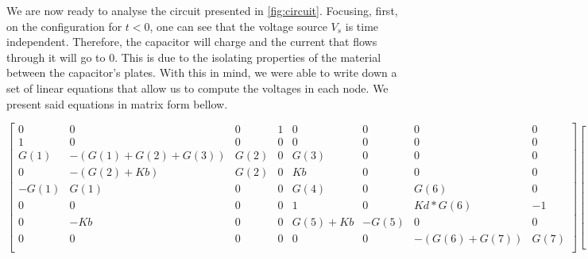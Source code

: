 We are now ready to analyse the circuit presented in \ref{fig:circuit}. Focusing, first, on the configuration for $t<0$, one can see that the voltage source $V_s$ is time independent. Therefore, the capacitor will charge and the current that flows through it will go to 0. This is due to the isolating properties of the material between the capacitor's plates. With this in mind, we were able to write down a set of linear equations that allow us to compute the voltages in each node. We present said equations in matrix form bellow.
\begin{center}
\begin{equation*}
\begin{bmatrix}
0&     0 & 0 & 1 & 0 & 0 & 0 & 0\\
1&     0 & 0 & 0 & 0 & 0 & 0 & 0\\
G(1)&  -(G(1)+G(2)+G(3))&    G(2)&   0&   G(3)&          0&   0&   0\\
0&     -(G(2)+Kb)&           G(2)&    0&    Kb&          0&   0&   0\\
-G(1)&   G(1)&                0&      0&    G(4)         &0   &G(6)    &0\\
0&       0&                   0&      0&     1&          0&   Kd*G(6)&-  1\\
0&      -Kb&                  0&      0&    G(5)+Kb&    -G(5)&       0&       0\\
0&       0&                   0&       0&    0&           0&   -(G(6)+G(7))&    G(7)\\

\end{bmatrix}
 \begin{bmatrix} V_1\\V_2\\V_3\\V_4\\V_5\\V_6\\V_7\\V_8 \end{bmatrix} =
 \begin{bmatrix} 0\\V_s\\0\\0\\0\\0\\0\\0 \end{bmatrix}
\end{equation*}
\end{center}

